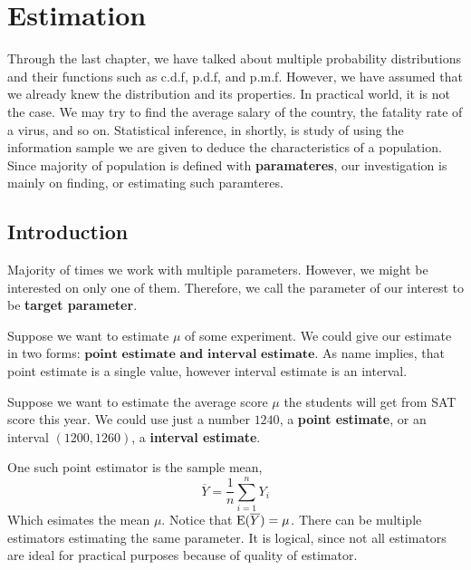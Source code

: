 \chapter{Estimation}
Through the last chapter, we have talked about multiple probability distributions and their functions such as c.d.f, p.d.f, and p.m.f. 
However, we have assumed that we already knew the distribution and its properties. In practical world, it is not the case.
We may try to find the average salary of the country, the fatality rate of a virus, and so on.
Statistical inference, in shortly, is study of using the information sample we are given to deduce the characteristics of a population.
Since majority of population is defined with \textbf{paramateres}, our investigation is mainly on finding, or estimating such paramteres.



\section{Introduction}
Majority of times we work with multiple parameters. However, we might be interested on only one of them. Therefore,  we call the parameter of our interest to be \textbf{target parameter}.
\par
    Suppose we want to estimate $\mu$ of some experiment. We could give our estimate in two forms: $\textbf{point estimate and interval estimate}$. As name implies, that point estimate is a single value, however interval estimate is an interval.

\begin{example}
    Suppose we want to estimate the average score  $\mu$ the students will get from SAT score this year. We could use just a number $1240$, a \textbf{point estimate}, or an interval $(1200,1260)$, a \textbf{interval estimate}.
\end{example}

One such point estimator is  the sample mean,
\[\overline{Y} = \frac{1}{n}\sum_{i=1}^nY_i\]
Which esimates the mean $\mu$. Notice that ${\operatorname{E}}(\overline{Y}) = \mu$. 
There can be multiple estimators estimating the same parameter. It is logical, since not all estimators are ideal for practical purposes because of quality of estimator.
